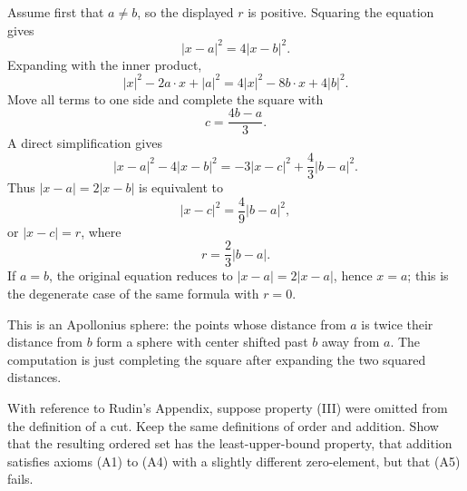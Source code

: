 \documentclass[main.tex]{subfiles}
\begin{document}
\begin{SolutionBlue}
Assume first that $a\neq b$, so the displayed $r$ is positive. Squaring the equation gives
\[
|x-a|^2=4|x-b|^2.
\]
Expanding with the inner product,
\[
|x|^2-2a\cdot x+|a|^2
=4|x|^2-8b\cdot x+4|b|^2.
\]
Move all terms to one side and complete the square with
\[
c=\frac{4b-a}{3}.
\]
A direct simplification gives
\[
|x-a|^2-4|x-b|^2
=-3|x-c|^2+\frac{4}{3}|b-a|^2.
\]
Thus $|x-a|=2|x-b|$ is equivalent to
\[
|x-c|^2=\frac{4}{9}|b-a|^2,
\]
or $|x-c|=r$, where
\[
r=\frac{2}{3}|b-a|.
\]
If $a=b$, the original equation reduces to $|x-a|=2|x-a|$, hence $x=a$; this is the degenerate case
of the same formula with $r=0$.
\end{SolutionBlue}

\begin{Reflection}
This is an Apollonius sphere: the points whose distance from $a$ is twice their distance from $b$ form
a sphere with center shifted past $b$ away from $a$. The computation is just completing the square
after expanding the two squared distances.
\end{Reflection}

With reference to Rudin's Appendix, suppose property (III) were omitted from the definition of a cut.
Keep the same definitions of order and addition. Show that the resulting ordered set has the
least-upper-bound property, that addition satisfies axioms (A1) to (A4) with a slightly different
zero-element, but that (A5) fails.
\end{document}
